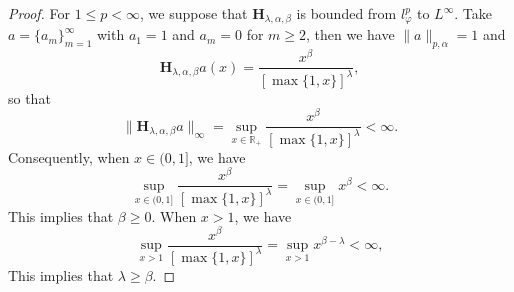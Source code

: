 \documentclass[10pt]{amsart}
\theoremstyle{definition}    %
\numberwithin{equation}{section}
\begin{document}
\begin{proof}
For $1\leq p<\infty$, we suppose that  $\mathbf{H}_{\lambda, \alpha, \beta}$ is bounded from $l_{\varphi}^p$ to $L^{\infty}$. Take $a=\{a_m\}_{m=1}^{\infty}$ with $a_1=1$ and $a_m=0$ for $m\geq 2$, then we have
$\|a\|_{p,\alpha}=1$ and
\begin{equation}
\mathbf{H}_{\lambda, \alpha, \beta}a(x)=\frac{x^{\beta}}{[\max\{1,x\}]^{\lambda}},\nonumber 
\end{equation}   
so that \begin{equation}
\|\mathbf{H}_{\lambda, \alpha, \beta}a\|_{\infty}=\sup_{x\in \mathbb{R}_{+}}\frac{x^{\beta}}{[\max\{1,x\}]^{\lambda}}<\infty.\nonumber 
\end{equation} 
Consequently, when $x\in (0,1]$, we have $$\sup_{x\in (0,1]}\frac{x^{\beta}}{[\max\{1,x\}]^{\lambda}}=\sup_{x\in (0,1]}x^{\beta}<\infty.$$ This implies that $\beta\geq 0.$  When $x>1$, we have 
$$\sup_{x>1}\frac{x^{\beta}}{[\max\{1,x\}]^{\lambda}}=\sup_{x>1}x^{\beta-\lambda}<\infty,$$
This implies that $\lambda\geq \beta.$


\end{proof}
\end{document}
